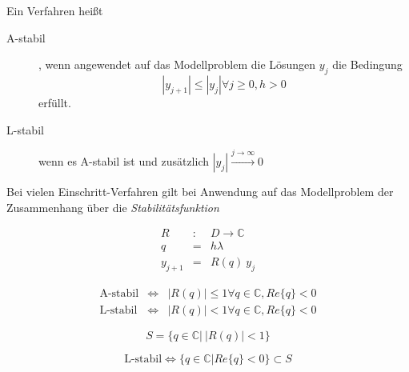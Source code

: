 \documentclass[10pt,a4paper]{article}
\begin{document}
\begin{defi}[Stabilität]
Ein Verfahren heißt
\begin{description}
\item[A-stabil], wenn angewendet auf das Modellproblem die Lösungen $y_j$ die Bedingung $$|y_{j+1}| \leq |y_j| \forall j \geq 0, h > 0$$ erfüllt.
\item[L-stabil] wenn es A-stabil ist und zusätzlich $|y_j| \stackrel{j \rightarrow \infty}{\rightarrow} 0$
\end{description}
\end{defi}

Bei vielen Einschritt-Verfahren gilt bei Anwendung auf das Modellproblem der Zusammenhang über die \emph{Stabilitätsfunktion}

\begin{defi}[Stabilitätsfunktion R]

\begin{eqnarray*}
R&:&D \rightarrow \mathbb{C}\\ 
q&=&h\lambda \\
y_{j+1}&=&R(q) ~ y_j 
\end{eqnarray*}

\end{defi}

\begin{defi}
\begin{eqnarray*}
\text{A-stabil} &\Leftrightarrow &|R(q)| \leq 1 \forall q \in \mathbb{C}, Re\{ q\} < 0\\
\text{L-stabil}  &\Leftrightarrow & |R(q)| < 1 \forall q \in \mathbb{C}, Re\{ q\} < 0
\end{eqnarray*}
\end{defi}

\begin{defi}[Stabilitätsgebiet $S$]
$$S=\{q \in \mathbb{C} | ~ |R(q)|<1 \}$$
\end{defi}

\begin{satz}
$$\text{L-stabil} \Leftrightarrow \{ q \in \mathbb{C} | Re\{ q\}<0 \} \subset S$$
\end{satz}
\end{document}
